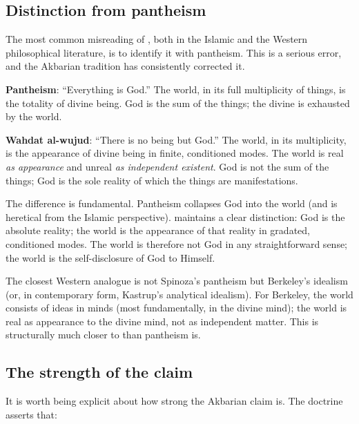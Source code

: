 \subsection{Distinction from pantheism}

The most common misreading of , both in the
Islamic and the Western philosophical literature, is to identify it
with pantheism. This is a serious error, and the Akbarian tradition
has consistently corrected it.

\begin{conceptbox}
\textbf{Pantheism}: ``Everything is God.'' The world, in its full
multiplicity of things, is the totality of divine being. God is the
sum of the things; the divine is exhausted by the world.

\textbf{Wahdat al-wujud}: ``There is no being but God.'' The world,
in its multiplicity, is the appearance of divine being in finite,
conditioned modes. The world is real \emph{as appearance} and
unreal \emph{as independent existent}. God is not the sum of the
things; God is the sole reality of which the things are
manifestations.
\end{conceptbox}

The difference is fundamental. Pantheism collapses God into the
world (and is heretical from the Islamic perspective).  maintains a clear distinction: God is the absolute
reality; the world is the appearance of that reality in
gradated, conditioned modes. The world is therefore not God in any
straightforward sense; the world is the self-disclosure of God to
Himself.

The closest Western analogue is not Spinoza's pantheism but
Berkeley's idealism (or, in contemporary form, Kastrup's analytical
idealism). For Berkeley, the world consists of ideas in minds (most
fundamentally, in the divine mind); the world is real as appearance
to the divine mind, not as independent matter. This is structurally
much closer to  than pantheism is.

\subsection{The strength of the claim}

It is worth being explicit about how strong the Akbarian claim is.
The doctrine asserts that:


